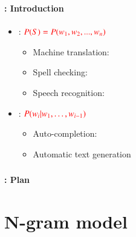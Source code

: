 \documentclass[xcolor=table]{beamer}
\subtitle[04- Language models]{Chapter 04\\Language models}
\begin{document}
	
\begin{frame}
	\frametitle{\inserttitle}
	\framesubtitle{\insertshortsubtitle: Introduction}

	\begin{itemize}
		\item {}: $\color{red} P(S) = P(w_1, w_2, ..., w_n) $
		\begin{itemize}
			\item Machine translation: \\
			\item Spell checking: \\
			\item Speech recognition: \\
		\end{itemize}
		\item {}: $\color{red} P(w_i | w_1, \ldots, w_{i-1}) $
		\begin{itemize}
			\item Auto-completion: \\
			\item Automatic text generation
		\end{itemize}
	\end{itemize}

\end{frame}


\begin{frame}
	\frametitle{\inserttitle}
	\framesubtitle{\insertshortsubtitle: Plan}

	\begin{multicols}{2}
	\tableofcontents
	\end{multicols}

\end{frame}

\section{N-gram model}
\end{document}

